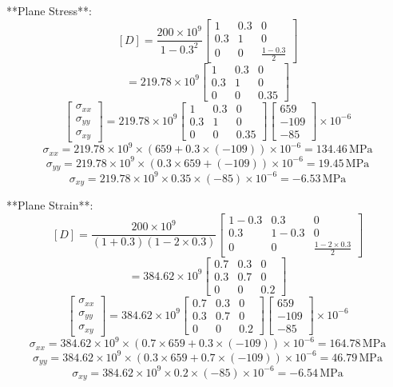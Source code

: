 **Plane Stress**:
\[
[D] = \frac{200 \times 10^9}{1 - 0.3^2} \begin{bmatrix} 1 & 0.3 & 0 \\ 0.3 & 1 & 0 \\ 0 & 0 & \frac{1 - 0.3}{2} \end{bmatrix}
\]
\[
= 219.78 \times 10^9 \begin{bmatrix} 1 & 0.3 & 0 \\ 0.3 & 1 & 0 \\ 0 & 0 & 0.35 \end{bmatrix}
\]
\[
\begin{bmatrix} \sigma_{xx} \\ \sigma_{yy} \\ \sigma_{xy} \end{bmatrix} = 219.78 \times 10^9 \begin{bmatrix} 1 & 0.3 & 0 \\ 0.3 & 1 & 0 \\ 0 & 0 & 0.35 \end{bmatrix} \begin{bmatrix} 659 \\ -109 \\ -85 \end{bmatrix} \times 10^{-6}
\]
\[
\sigma_{xx} = 219.78 \times 10^9 \times (659 + 0.3 \times (-109)) \times 10^{-6} = 134.46 \, \text{MPa}
\]
\[
\sigma_{yy} = 219.78 \times 10^9 \times (0.3 \times 659 + (-109)) \times 10^{-6} = 19.45 \, \text{MPa}
\]
\[
\sigma_{xy} = 219.78 \times 10^9 \times 0.35 \times (-85) \times 10^{-6} = -6.53 \, \text{MPa}
\]

**Plane Strain**:
\[
[D] = \frac{200 \times 10^9}{(1 + 0.3)(1 - 2 \times 0.3)} \begin{bmatrix} 1 - 0.3 & 0.3 & 0 \\ 0.3 & 1 - 0.3 & 0 \\ 0 & 0 & \frac{1 - 2 \times 0.3}{2} \end{bmatrix}
\]
\[
= 384.62 \times 10^9 \begin{bmatrix} 0.7 & 0.3 & 0 \\ 0.3 & 0.7 & 0 \\ 0 & 0 & 0.2 \end{bmatrix}
\]
\[
\begin{bmatrix} \sigma_{xx} \\ \sigma_{yy} \\ \sigma_{xy} \end{bmatrix} = 384.62 \times 10^9 \begin{bmatrix} 0.7 & 0.3 & 0 \\ 0.3 & 0.7 & 0 \\ 0 & 0 & 0.2 \end{bmatrix} \begin{bmatrix} 659 \\ -109 \\ -85 \end{bmatrix} \times 10^{-6}
\]
\[
\sigma_{xx} = 384.62 \times 10^9 \times (0.7 \times 659 + 0.3 \times (-109)) \times 10^{-6} = 164.78 \, \text{MPa}
\]
\[
\sigma_{yy} = 384.62 \times 10^9 \times (0.3 \times 659 + 0.7 \times (-109)) \times 10^{-6} = 46.79 \, \text{MPa}
\]
\[
\sigma_{xy} = 384.62 \times 10^9 \times 0.2 \times (-85) \times 10^{-6} = -6.54 \, \text{MPa}
\]

